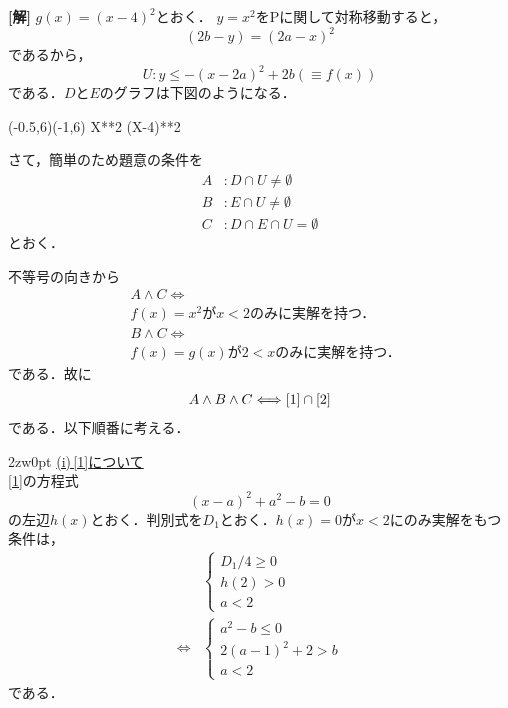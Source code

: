 \documentclass[a4j]{jarticle}
\begin{document}
\begin{multicols}{2}
{\bf[解]} $g(x)=(x-4)^2$とおく．
$y=x^2$をPに関して対称移動すると，
     \[(2b-y)=(2a-x)^2\]
であるから，
     \[U:y\le -(x-2a)^2+2b(\equiv f(x))\]
である．$D$と$E$のグラフは下図のようになる．\\

     \begin{zahyou}[ul=5mm](-0.5,6)(-1,6)
     \def\Fx{X**2}
     \def\Gx{(X-4)**2}
     \YGurafu\Fx{\xmin}{\xmax}
     \YGurafu*\Gx
     \Put{}
     \Put{}
     \Put\C[syaei=xy]{}
     \Put{}
     \end{zahyou}

     

さて，簡単のため題意の条件を
     \begin{align*}
     A&:D\cap U\not=\emptyset \\
     B&:E\cap U\not=\emptyset \\
     C&:D\cap E\cap U=\emptyset
     \end{align*}
とおく．
     
不等号の向きから
     \begin{align}
           &A\land C \Longleftrightarrow \nonumber\\
           &f(x)=x^2\text{が$x<2$のみに実解を持つ．} \label{1}\\
           &B\land C \Longleftrightarrow \nonumber\\
           &f(x)=g(x)\text{が$2<x$のみに実解を持つ．}\label{2}
     \end{align}
である．故に
     \begin{align}
     A\land B\land C \Longleftrightarrow \eqref{1}\cap\eqref{2}\label{3}
     \end{align}
である．以下順番に考える．\\

     \begin{indentation}{2zw}{0pt}
     \noindent\underline{(i)\,\eqref{1}について}\\
     \eqref{1}の方程式
          \[(x-a)^2+a^2-b=0\]
     の左辺$h(x)$とおく．判別式を$D_1$とおく．$h(x)=0$が$x<2$にのみ実解をもつ条件は，
          \begin{align*}
               &\begin{cases}
               D_1/4\ge0 \\
               h(2)>0 \\
               a<2
               \end{cases}\\
          \Longleftrightarrow
               &\begin{cases}
               a^2-b\le0 \\
               2(a-1)^2+2>b \\
               a<2
               \end{cases}
          \end{align*}     
     である．\\
     

\end{indentation}
\end{multicols}
\end{document}
